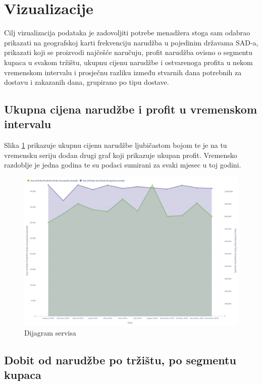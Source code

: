 \documentclass[12pt, oneside]{book}
\begin{document}
\section{Vizualizacije}
Cilj vizualizacija podataka je zadovoljiti potrebe menadžera stoga sam odabrao  prikazati na geografskoj karti frekvenciju narudžba u pojedinim državama SAD-a, prikazati koji se proizvodi najčešće naručuju, profit narudžba ovisno o segmentu kupaca u svakom tržištu, ukupnu cijenu narudžbe i ostvarenoga profita u nekom vremenskom intervalu i prosječnu razliku između stvarnih dana potrebnih za dostavu i zakazanih dana, grupirano po tipu dostave. 



\subsection{Ukupna cijena narudžbe i profit u vremenskom intervalu}
Slika \ref{OrderTotalProfit} prikazuje ukupnu cijenu narudžbe ljubičastom bojom te je na tu vremensku seriju dodan drugi graf koji prikazuje ukupan profit. Vremensko razdoblje je jedna godina te su podaci sumirani za svaki mjesec u toj godini.

\begin{figure}[H]
\label{OrderTotalProfit}
\includegraphics[width=16cm]{images/Metabase-OrderTotalProfit.png}
\centering
\caption{Dijagram servisa}
\end{figure}

\subsection{Dobit od narudžbe po tržištu, po segmentu kupaca}
\end{document}
